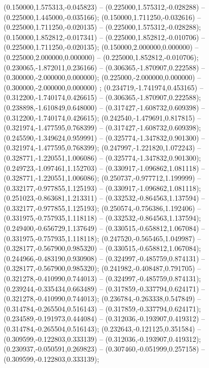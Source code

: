  (0.150000,1.575313,-0.045823) -- (0.225000,1.575312,-0.028288) -- (0.225000,1.445000,-0.035166);
 (0.150000,1.711250,-0.032616) -- (0.225000,1.711250,-0.020135) -- (0.225000,1.575312,-0.028288);
 (0.150000,1.852812,-0.017341) -- (0.225000,1.852812,-0.010706) -- (0.225000,1.711250,-0.020135);
 (0.150000,2.000000,0.000000) -- (0.225000,2.000000,0.000000) -- (0.225000,1.852812,-0.010706);
 (0.230065,-1.872011,0.236166) -- (0.306365,-1.870907,0.222588) -- (0.300000,-2.000000,0.000000);
 (0.225000,-2.000000,0.000000) -- (0.300000,-2.000000,0.000000) ;
 (0.234719,-1.741974,0.453165) -- (0.312200,-1.740174,0.426615) -- (0.306365,-1.870907,0.222588);
 (0.238898,-1.610849,0.648000) -- (0.317427,-1.608732,0.609398) -- (0.312200,-1.740174,0.426615);
 (0.242540,-1.479691,0.817815) -- (0.321974,-1.477595,0.768399) -- (0.317427,-1.608732,0.609398);
 (0.245590,-1.349624,0.959991) -- (0.325774,-1.347832,0.901300) -- (0.321974,-1.477595,0.768399);
 (0.247997,-1.221820,1.072243) -- (0.328771,-1.220551,1.006086) -- (0.325774,-1.347832,0.901300);
 (0.249723,-1.097461,1.152703) -- (0.330917,-1.096862,1.081118) -- (0.328771,-1.220551,1.006086);
 (0.250737,-0.977712,1.199999) -- (0.332177,-0.977855,1.125193) -- (0.330917,-1.096862,1.081118);
 (0.251023,-0.863681,1.213311) -- (0.332532,-0.864563,1.137594) -- (0.332177,-0.977855,1.125193);
 (0.250574,-0.756386,1.192406) -- (0.331975,-0.757935,1.118118) -- (0.332532,-0.864563,1.137594);
 (0.249400,-0.656729,1.137649) -- (0.330515,-0.658812,1.067084) -- (0.331975,-0.757935,1.118118);
 (0.247520,-0.565465,1.049987) -- (0.328177,-0.567900,0.985320) -- (0.330515,-0.658812,1.067084);
 (0.244966,-0.483190,0.930908) -- (0.324997,-0.485759,0.874131) -- (0.328177,-0.567900,0.985320);
 (0.241982,-0.408487,0.791705) -- (0.321278,-0.410990,0.744013) -- (0.324997,-0.485759,0.874131);
 (0.239244,-0.335434,0.663489) -- (0.317859,-0.337794,0.624171) -- (0.321278,-0.410990,0.744013);
 (0.236784,-0.263338,0.547849) -- (0.314784,-0.265504,0.516143) -- (0.317859,-0.337794,0.624171);
 (0.234589,-0.191973,0.444084) -- (0.312036,-0.193907,0.419312) -- (0.314784,-0.265504,0.516143);
 (0.232643,-0.121125,0.351584) -- (0.309599,-0.122803,0.333139) -- (0.312036,-0.193907,0.419312);
 (0.230937,-0.050591,0.269823) -- (0.307460,-0.051999,0.257158) -- (0.309599,-0.122803,0.333139);
